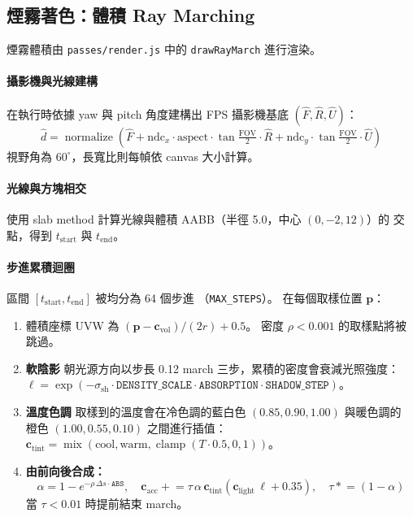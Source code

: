 \documentclass[a4paper, 12pt]{article}
\begin{document}
\subsection{煙霧著色：體積 Ray Marching}

煙霧體積由 \texttt{passes/render.js} 中的 \texttt{drawRayMarch} 進行渲染。

\paragraph{攝影機與光線建構}
在執行時依據 yaw 與 pitch 角度建構出 FPS 攝影機基底
$(\hat{F},\hat{R},\hat{U})$：
\[
  \hat{d} = \operatorname{normalize}\!\left(
    \hat{F}
    + \mathrm{ndc}_x\cdot\mathrm{aspect}\cdot\tan\tfrac{\mathrm{FOV}}{2}\cdot\hat{R}
    + \mathrm{ndc}_y\cdot\tan\tfrac{\mathrm{FOV}}{2}\cdot\hat{U}
  \right)
\]
視野角為 $60^\circ$，長寬比則每幀依 canvas 大小計算。

\paragraph{光線與方塊相交}
使用 slab method 計算光線與體積 AABB（半徑 5.0，中心 $(0,-2,12)$）的
交點，得到 $t_{\text{start}}$ 與 $t_{\text{end}}$。

\paragraph{步進累積迴圈}
區間 $[t_{\text{start}},t_{\text{end}}]$ 被均分為 64 個步進
（\texttt{MAX\_STEPS}）。
在每個取樣位置 $\mathbf{p}$：

\begin{enumerate}[nosep]
\item 體積座標 UVW 為 $(\mathbf{p}-\mathbf{c}_{\text{vol}})/(2r)+0.5$。
      密度 $\rho<0.001$ 的取樣點將被跳過。

\item \textbf{軟陰影}
      朝光源方向以步長 0.12 march 三步，累積的密度會衰減光照強度：
      $\ell = \exp(-\sigma_{\text{sh}}\cdot\texttt{DENSITY\_SCALE}\cdot
      \texttt{ABSORPTION}\cdot\texttt{SHADOW\_STEP})$。

\item \textbf{溫度色調}
      取樣到的溫度會在冷色調的藍白色 $(0.85,0.90,1.00)$ 與暖色調的
      橙色 $(1.00,0.55,0.10)$ 之間進行插值：
      $\mathbf{c}_{\text{tint}}=\operatorname{mix}(\text{cool},\text{warm},
      \operatorname{clamp}(T\cdot0.5,0,1))$。

\item \textbf{由前向後合成：}
      \[
        \alpha = 1-e^{-\rho\,\Delta s\cdot\texttt{ABS}},\quad
        \mathbf{c}_{\text{acc}} \mathrel{+}= \tau\,\alpha\,
          \mathbf{c}_{\text{tint}}(\mathbf{c}_{\text{light}}\,\ell+0.35),\quad
        \tau \mathrel{*}= (1-\alpha)
      \]
      當 $\tau<0.01$ 時提前結束 march。
\end{enumerate}
\end{document}
